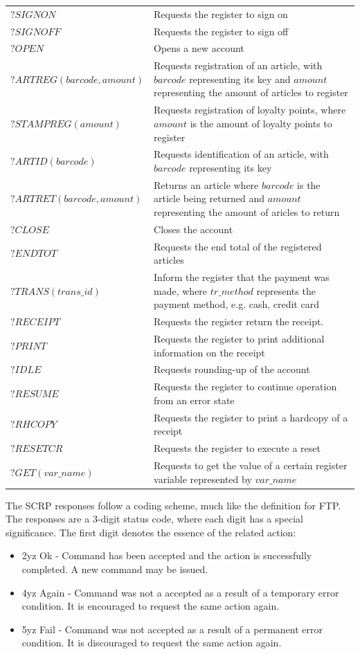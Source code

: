 \begin{tabular}{lp{280px}} 
$\mathit{?SIGNON}$ & Requests the register to sign on\\
$\mathit{?SIGNOFF}$ & Requests the register to sign off\\
$\mathit{?OPEN}$ & Opens a new account\\
$\mathit{?ARTREG(barcode, amount)}$ & Requests registration of an article, with $\mathit{barcode}$ representing its key and $\mathit{amount}$ representing the amount of articles to register\\
$\mathit{?STAMPREG(amount)}$ & Requests registration of loyalty points, where $\mathit{amount}$ is the amount of loyalty points to register\\
$\mathit{?ARTID(barcode)}$ & Requests identification of an article, with $\mathit{barcode}$ representing its key\\
$\mathit{?ARTRET(barcode, amount)}$ & Returns an article where $\mathit{barcode}$ is the article being returned and $\mathit{amount}$ representing the amount of aricles to return\\
$\mathit{?CLOSE}$ & Closes the account\\
$\mathit{?ENDTOT}$ & Requests the end total of the registered articles\\
$\mathit{?TRANS(trans\_id)}$ & Inform the register that the payment was made, where $\mathit{tr\_method}$ represents the payment method, e.g. cash, credit card\\
$\mathit{?RECEIPT}$ & Requests the register return the receipt.\\
$\mathit{?PRINT}$ & Requests the register to print additional information on the receipt\\
$\mathit{?IDLE}$ & Requests rounding-up of the account\\
$\mathit{?RESUME}$ & Requests the register to continue operation from an error state\\
$\mathit{?RHCOPY}$ & Requests the register to print a hardcopy of a receipt\\
$\mathit{?RESETCR}$ & Requests the register to execute a reset \\
$\mathit{?GET(var\_name)}$ & Requests to get the value of a certain register variable represented by $\mathit{var\_name}$
\end{tabular}

The SCRP responses follow a coding scheme, much like the definition for FTP. The responses are a 3-digit status code, where each digit has a special significance. The first digit denotes the essence of the related action:
\begin{itemize}
\item 2yz Ok - Command has been accepted and the action is successfully completed. A new command may be issued.
\item 4yz Again - Command was not a accepted as a result of a temporary error condition. It is encouraged to request the same action again.
\item 5yz Fail - Command was not accepted as a result of a permanent error condition. It is discouraged to request the same action again.
\end{itemize}

